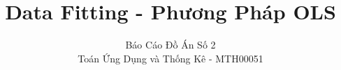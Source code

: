 \documentclass{reportDoCS2025}
\title{Data Fitting - Phương Pháp OLS}
\subtitle{Báo Cáo Đồ Án Số 2 \\ Toán Ứng Dụng và Thống Kê - MTH00051}
\begin{document}
\cover
\numRoman

% 



\contents

% 

\pageNumber





% 




\listTables
\listImages
\end{document}
